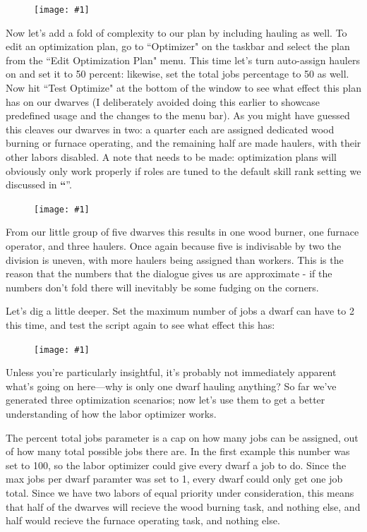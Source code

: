\documentclass[]{article}
\newcommand{\jump}[1] {\textbf{``\nameref{sec:#1}}''}
\newcommand{\fullfigure}[1] {
\begin{figure}[h!]
\texttt{[image: \#1]}
\end{figure}
}
\begin{document}
\fullfigure{Sec4Fig10}

Now let's add a fold of complexity to our plan by including hauling as well. To edit an optimization
plan, go to ``Optimizer" on the taskbar and select the plan from the ``Edit Optimization Plan" menu. This
time let's turn auto-assign haulers on and set it to 50 percent: likewise, set the total jobs percentage
to 50 as well. Now hit ``Test Optimize" at the bottom of the window to see what effect this plan has on
our dwarves (I deliberately avoided doing this earlier to showcase predefined usage and the changes to
the menu bar). As you might have guessed this cleaves our dwarves in two: a quarter each are assigned
dedicated wood burning or furnace operating, and the remaining half are made haulers, with their other
labors disabled. A note that needs to be made: optimization plans will obviously only work properly if
roles are tuned to the default skill rank setting we discussed in \jump{Roles}.

\fullfigure{Sec4Fig11}

From our little group of five dwarves this results in one wood burner, one furnace operator, and three
haulers. Once again because five is indivisable by two the division is uneven, with more haulers being
assigned than workers.  This is the reason that the numbers that the dialogue gives us are approximate -
if the numbers don't fold there will inevitably be some fudging on the corners.

Let's dig a little deeper. Set the maximum number of jobs a dwarf can have to 2 this time, and test the
script again to see what effect this has:
\fullfigure{Sec4Fig12}

Unless you're particularly insightful, it's probably not immediately apparent what's going on here---why
is only one dwarf hauling anything? So far we've generated three optimization scenarios; now let's use
them to get a better understanding of how the labor optimizer works.

The percent total jobs parameter is a cap on how many jobs can be assigned, out of how many total
possible jobs there are. In the first example this number was set to 100, so the labor optimizer could
give every dwarf a job to do. Since the max jobs per dwarf paramter was set to 1, every dwarf could only
get one job total. Since we have two labors of equal priority under consideration, this means that half
of the dwarves will recieve the wood burning task, and nothing else, and half would recieve the furnace
operating task, and nothing else.
\end{document}
